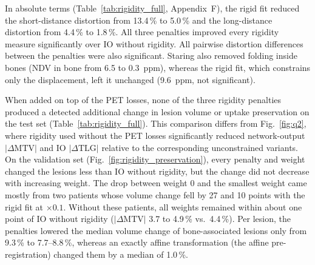 In absolute terms (Table~\ref{tab:rigidity_full}, Appendix~F), the rigid fit reduced the short-distance distortion from 13.4\,\% to 5.0\,\% and the long-distance distortion from 4.4\,\% to 1.8\,\%.
All three penalties improved every rigidity measure significantly over IO without rigidity.
All pairwise distortion differences between the penalties were also significant.
Staring also removed folding inside bones (NDV in bone from 6.5 to 0.3~ppm), whereas the rigid fit, which constrains only the displacement, left it unchanged (9.6~ppm, not significant).

When added on top of the PET losses, none of the three rigidity penalties produced a detected additional change in lesion volume or uptake preservation on the test set (Table~\ref{tab:rigidity_full}).
This comparison differs from Fig.~\ref{fig:q2}, where rigidity used without the PET losses significantly reduced network-output $|\Delta\mathrm{MTV}|$ and IO $|\Delta\mathrm{TLG}|$ relative to the corresponding unconstrained variants.
On the validation set (Fig.~\ref{fig:rigidity_preservation}), every penalty and weight changed the lesions less than IO without rigidity, but the change did not decrease with increasing weight.
The drop between weight 0 and the smallest weight came mostly from two patients whose volume change fell by 27 and 10 points with the rigid fit at $\times0.1$.
Without these patients, all weights remained within about one point of IO without rigidity ($|\Delta\mathrm{MTV}|$ 3.7 to 4.9\,\% vs.\ 4.4\,\%).
Per lesion, the penalties lowered the median volume change of bone-associated lesions only from 9.3\,\% to 7.7--8.8\,\%, whereas an exactly affine transformation (the affine pre-registration) changed them by a median of 1.0\,\%.




